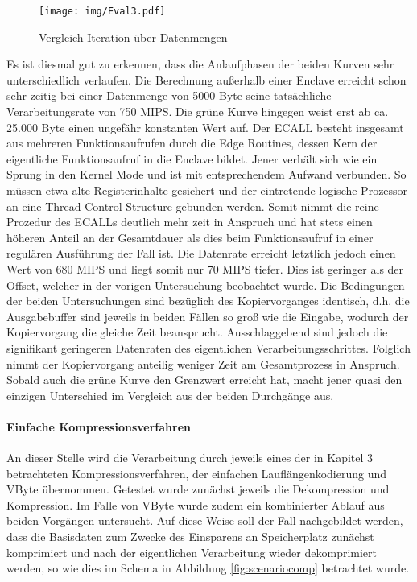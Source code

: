 \begin{figure}[h]
	\texttt{[image: img/Eval3.pdf]}
	\centering
	\caption{Vergleich Iteration über Datenmengen}
	\label{fig:eval3}
\end{figure}

Es ist diesmal gut zu erkennen, dass die Anlaufphasen der beiden Kurven sehr unterschiedlich verlaufen. Die Berechnung außerhalb einer Enclave erreicht schon sehr zeitig bei einer Datenmenge von 5000 Byte seine tatsächliche Verarbeitungsrate von 750 MIPS. Die grüne Kurve hingegen weist erst ab ca. 25.000 Byte einen ungefähr konstanten Wert auf. Der ECALL besteht insgesamt aus mehreren Funktionsaufrufen durch die Edge Routines, dessen Kern der eigentliche Funktionsaufruf in die Enclave bildet. Jener verhält sich wie ein Sprung in den Kernel Mode und ist mit entsprechendem Aufwand verbunden. So müssen etwa alte Registerinhalte gesichert und der eintretende logische Prozessor an eine Thread Control Structure gebunden werden. Somit nimmt die reine Prozedur des ECALLs deutlich mehr zeit in Anspruch und hat stets einen höheren Anteil an der Gesamtdauer als dies beim Funktionsaufruf in einer regulären Ausführung der Fall ist. Die Datenrate erreicht letztlich jedoch einen Wert von 680 MIPS und liegt somit nur 70 MIPS tiefer. Dies ist geringer als der Offset, welcher in der vorigen Untersuchung beobachtet wurde. Die Bedingungen der beiden Untersuchungen sind bezüglich des Kopiervorganges identisch, d.h. die Ausgabebuffer sind jeweils in beiden Fällen so groß wie die Eingabe, wodurch der Kopiervorgang die gleiche Zeit beansprucht. Ausschlaggebend sind jedoch die signifikant geringeren Datenraten des eigentlichen Verarbeitungsschrittes. Folglich nimmt der Kopiervorgang anteilig weniger Zeit am Gesamtprozess in Anspruch. Sobald auch die grüne Kurve den Grenzwert erreicht hat, macht jener quasi den einzigen Unterschied im Vergleich aus der beiden Durchgänge aus.

\paragraph{Einfache Kompressionsverfahren}

An dieser Stelle wird die Verarbeitung durch jeweils eines der in Kapitel 3 betrachteten Kompressionsverfahren, der einfachen Lauflängenkodierung und VByte übernommen. Getestet wurde zunächst jeweils die Dekompression und Kompression. Im Falle von VByte wurde zudem ein kombinierter Ablauf aus beiden Vorgängen untersucht. Auf diese Weise soll der Fall nachgebildet werden, dass die Basisdaten zum Zwecke des Einsparens an Speicherplatz zunächst komprimiert und nach der eigentlichen Verarbeitung wieder dekomprimiert werden, so wie dies im Schema in Abbildung \ref{fig:scenariocomp} betrachtet wurde.

